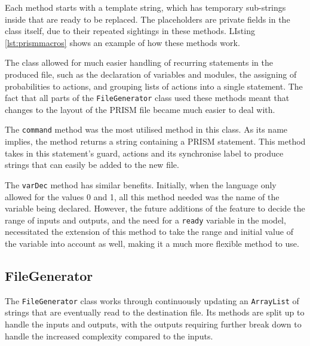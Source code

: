 \documentclass[report.tex]{subfiles}
\begin{document}
Each method starts with a template string, which has temporary sub-strings
inside that are ready to be replaced. The placeholders are private fields in the
class itself, due to their repeated sightings in these methods. LIsting
\ref{lst:prismmacros} shows an example of how these methods work.



The class allowed for much easier handling of recurring statements in the
produced file, such as the declaration of variables and modules, the assigning
of probabilities to actions, and grouping lists of actions into a single
statement. The fact that all parts of the \texttt{FileGenerator} class used
these methods meant that changes to the layout of the PRISM file became much
easier to deal with.

The \texttt{command} method was the most utilised method in this class. As its
name implies, the method returns a string containing a PRISM statement. This
method takes in this statement's guard, actions and its synchronise label to
produce strings that can easily be added to the new file.

The \texttt{varDec} method has similar benefits. Initially, when the language
only allowed for the values 0 and 1, all this method needed was the name of the
variable being declared. However, the future additions of the feature to
decide the range of inputs and outputs, and the need for a \texttt{ready}
variable in the model, necessitated the extension of this method to take the
range and initial value of the variable into account as well, making it a much
more flexible method to use.

\subsection{FileGenerator} %
\label{sub:filegenerator}
The \texttt{FileGenerator} class works through continuously updating an
\texttt{ArrayList} of strings that are eventually read to the destination file.
Its methods are split up to handle the inputs and outputs, with the outputs
requiring further break down to handle the increased complexity compared to the
inputs.


\end{document}
